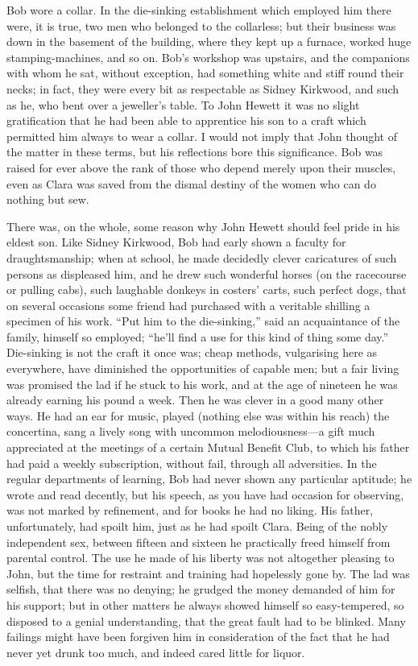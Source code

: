 Bob wore a collar. In the die-sinking establishment which employed him
there were, it is true, two men who belonged to the collarless; but
their business was down in the basement of the building, where they kept
up a furnace, worked huge stamping-machines, and so on. Bob's workshop
was upstairs, and the companions with whom he sat, without exception,
had something white and stiff round their necks; in fact, they were
every bit as respectable as Sidney Kirkwood, and such as he, who bent
over a {\protect\hypertarget{168}{}{}}jeweller's table. To John Hewett
it was no slight gratification that he had been able to apprentice his
son to a craft which permitted him always to wear a collar. I would not
imply that John thought of the matter in these terms, but his
reflections bore this significance. Bob was raised for ever above the
rank of those who depend merely upon their muscles, even as Clara was
saved from the dismal destiny of the women who can do nothing but sew.

There was, on the whole, some reason why John Hewett should feel pride
in his eldest son. Like Sidney Kirkwood, Bob had early shown a faculty
for draughtsmanship; when at school, he made decidedly clever
caricatures of such persons as displeased him, and he drew such
wonderful horses (on the racecourse or pulling cabs), such laughable
donkeys in costers' carts, such perfect dogs, that on several occasions
some friend had purchased with a veritable shilling a specimen of his
work. ``Put him to the die-sinking,'' said an acquaintance of the
family, himself so {\protect\hypertarget{169}{}{}}employed; ``he'll find
a use for this kind of thing some day.'' Die-sinking is not the craft it
once was; cheap methods, vulgarising here as everywhere, have diminished
the opportunities of capable men; but a fair living was promised the lad
if he stuck to his work, and at the age of nineteen he was already
earning his pound a week. Then he was clever in a good many other ways.
He had an ear for music, played (nothing else was within his reach) the
concertina, sang a lively song with uncommon melodiousness---a gift much
appreciated at the meetings of a certain Mutual Benefit Club, to which
his father had paid a weekly subscription, without fail, through all
adversities. In the regular departments of learning, Bob had never shown
any particular aptitude; he wrote and read decently, but his speech, as
you have had occasion for observing, was not marked by refinement, and
for books he had no liking. His father, unfortunately, had spoilt him,
just as he had spoilt Clara. Being of the nobly independent sex, between
{\protect\hypertarget{170}{}{}}fifteen and sixteen he practically freed
himself from parental control. The use he made of his liberty was not
altogether pleasing to John, but the time for restraint and training had
hopelessly gone by. The lad was selfish, that there was no denying; he
grudged the money demanded of him for his support; but in other matters
he always showed himself so easy-tempered, so disposed to a genial
understanding, that the great fault had to be blinked. Many failings
might have been forgiven him in consideration of the fact that he had
never yet drunk too much, and indeed cared little for liquor.

